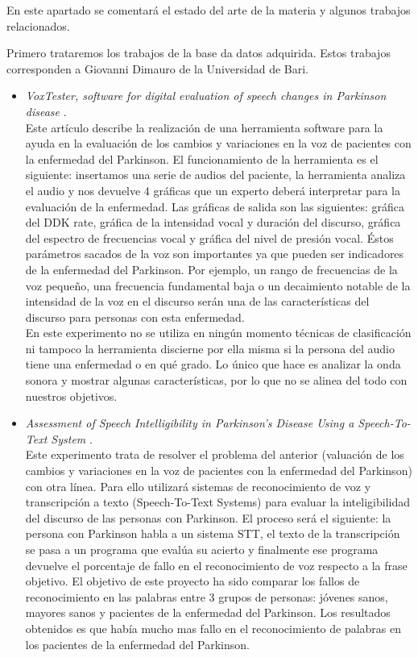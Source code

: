 
En este apartado se comentará el estado del arte de la materia y algunos trabajos relacionados.\newline

Primero trataremos los trabajos de la base da datos adquirida. Estos trabajos corresponden a Giovanni Dimauro de la Universidad de Bari.
\begin{itemize}
	\item \textit{VoxTester, software for digital evaluation of speech changes in Parkinson disease} \cite{giovanni1}.\\
	Este artículo describe la realización de una herramienta software para la ayuda en la evaluación de los cambios y variaciones en la voz de pacientes con la enfermedad del Parkinson. El funcionamiento de la herramienta es el siguiente: insertamos una serie de audios del paciente, la herramienta analiza el audio y nos devuelve 4 gráficas que un experto deberá interpretar para la evaluación de la enfermedad. Las gráficas de salida son las siguientes: gráfica del DDK rate, gráfica de la intensidad vocal y duración del discurso, gráfica del espectro de frecuencias vocal y gráfica del nivel de presión vocal. Éstos parámetros sacados de la voz son importantes ya que pueden ser indicadores de la enfermedad del Parkinson. Por ejemplo, un rango de frecuencias de la voz pequeño, una frecuencia fundamental baja o un decaimiento notable de la intensidad de la voz en el discurso serán una de las características del discurso para personas con esta enfermedad.\\
	En este experimento no se utiliza en ningún momento técnicas de clasificación ni tampoco la herramienta discierne por ella misma si la persona del audio tiene una enfermedad o en qué grado. Lo único que hace es analizar la onda sonora y mostrar algunas características, por lo que no se alinea del todo con nuestros objetivos.
	\item \textit{Assessment of Speech Intelligibility in Parkinson’s Disease Using a Speech-To-Text System} \cite{giovanni2}.\\
	Este experimento trata de resolver el problema del anterior (valuación de los cambios y variaciones en la voz de pacientes con la enfermedad del Parkinson) con otra línea. Para ello utilizará sistemas de reconocimiento de voz y transcripción a texto (Speech-To-Text Systems) para evaluar la inteligibilidad del discurso de las personas con Parkinson. El proceso será el siguiente: la persona con Parkinson habla a un sistema STT, el texto de la transcripción se pasa a un programa que evalúa su acierto y finalmente ese programa devuelve el porcentaje de fallo en el reconocimiento de voz respecto a la frase objetivo. El objetivo de este proyecto ha sido comparar los fallos de reconocimiento en las palabras entre 3 grupos de personas: jóvenes sanos, mayores sanos y pacientes de la enfermedad del Parkinson. Los resultados obtenidos es que había mucho mas fallo en el reconocimiento de palabras en los pacientes de la enfermedad del Parkinson.
	
\end{itemize}